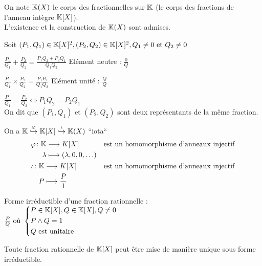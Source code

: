 \documentclass[12pt,twoside,a4paper]{article}
\author{MPSI 2}
\begin{document}
	\maketitle
	On note $\mathbb{K}(X)$ le corps des fractionnelles sur $\mathbb{K}$ (le corps des fractions de l'anneau int\`egre $\mathbb{K}[X]$). \\
	L'existence et la construction de $\mathbb{K}(X)$ sont admises. \\
	\begin{liste}
		\item Soit $(P_1,Q_1)\in\mathbb{K}[X]^2,(P_2,Q_2)\in\mathbb{K}[X]^2,Q_1\neq0\text{ et } Q_2\neq0$ \\
			\begin{liste}
				\item $\frac{P_1}{Q_1}+\frac{P_2}{Q_2}=\frac{P_1Q_2+P_2Q_1}{Q_1Q_2}$ El\'ement neutre : $\frac0Q$
				\item $\frac{P_1}{Q_1}\times\frac{P_2}{Q_2}=\frac{P_1P_2}{Q_1Q_2}$ El\'ement unit\'e : $\frac{Q}Q$
				\item $\frac{P_1}{Q_1}=\frac{P_2}{Q_2}\iff P_1Q_2=P_2Q_1$ \\
					On dit que $(P_1,Q_1)$ et $(P_2,Q_2)$ sont deux repr\'esentants de la m\^eme fraction.
			\end{liste}
		\item On a $\mathbb{K}\overset{\varphi}\hookrightarrow\mathbb{K}[X]\overset{\iota}\hookrightarrow\mathbb{K}(X)$ ``iota`` \\
			$$\begin{aligned}
				&\begin{aligned}[t]\varphi\colon\mathbb{K}&\longrightarrow K[X] \\\lambda&\longmapsto(\lambda,0,0,\ldots)\end{aligned}&&\text{est un homomorphisme d'anneaux injectif} \\
				&\begin{aligned}[t]\iota\colon\mathbb{K}&\longrightarrow K[X] \\P&\longmapsto\frac P1\end{aligned}&&\text{est un homomorphisme d'anneaux injectif}
			\end{aligned}$$
		\item Forme irr\'eductible d'une fraction rationnelle : \\
			$\frac PQ\text{ o\`u }\left\{\begin{aligned}&P\in\mathbb{K}[X],Q\in\mathbb{K}[X],Q\neq0 \\
														&P\wedge Q=1\\
														&Q\text{ est unitaire}\end{aligned}\right.$
	\end{liste}
	\begin{prop}
		Toute fraction rationnelle de $\mathbb{K}[X]$ peut \^etre mise de mani\`ere unique sous forme irr\'eductible.
	\end{prop}
\end{document}
